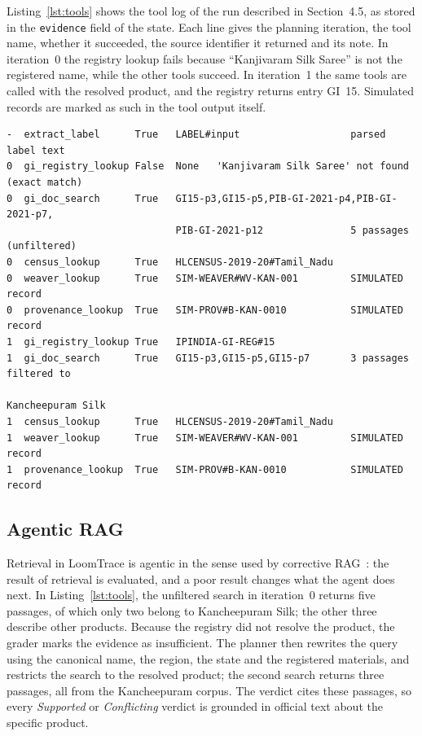 Listing~\ref{lst:tools} shows the tool log of the run described in Section~4.5, as stored in the
\texttt{evidence} field of the state. Each line gives the planning iteration, the tool name, whether it
succeeded, the source identifier it returned and its note. In iteration~0 the registry lookup fails
because ``Kanjivaram Silk Saree'' is not the registered name, while the other tools succeed. In
iteration~1 the same tools are called with the resolved product, and the registry returns entry GI~15.
Simulated records are marked as such in the tool output itself.

\begin{lstlisting}[language={},caption={Tool calls for the Kanjivaram case (iteration, tool, ok, source ID, note)},label={lst:tools}]
-  extract_label      True   LABEL#input                   parsed label text
0  gi_registry_lookup False  None   'Kanjivaram Silk Saree' not found (exact match)
0  gi_doc_search      True   GI15-p3,GI15-p5,PIB-GI-2021-p4,PIB-GI-2021-p7,
                             PIB-GI-2021-p12               5 passages (unfiltered)
0  census_lookup      True   HLCENSUS-2019-20#Tamil_Nadu
0  weaver_lookup      True   SIM-WEAVER#WV-KAN-001         SIMULATED record
0  provenance_lookup  True   SIM-PROV#B-KAN-0010           SIMULATED record
1  gi_registry_lookup True   IPINDIA-GI-REG#15
1  gi_doc_search      True   GI15-p3,GI15-p5,GI15-p7       3 passages filtered to
                                                           Kancheepuram Silk
1  census_lookup      True   HLCENSUS-2019-20#Tamil_Nadu
1  weaver_lookup      True   SIM-WEAVER#WV-KAN-001         SIMULATED record
1  provenance_lookup  True   SIM-PROV#B-KAN-0010           SIMULATED record
\end{lstlisting}

\subsection{Agentic RAG}

Retrieval in LoomTrace is agentic in the sense used by corrective RAG~\cite{yan2024crag}: the result
of retrieval is evaluated, and a poor result changes what the agent does next. In
Listing~\ref{lst:tools}, the unfiltered search in iteration~0 returns five passages, of which only two
belong to Kancheepuram Silk; the other three describe other products. Because the registry did not
resolve the product, the grader marks the evidence as insufficient. The planner then rewrites the
query using the canonical name, the region, the state and the registered materials, and restricts the
search to the resolved product; the second search returns three passages, all from the Kancheepuram
corpus. The verdict cites these passages, so every \emph{Supported} or \emph{Conflicting} verdict is
grounded in official text about the specific product.

